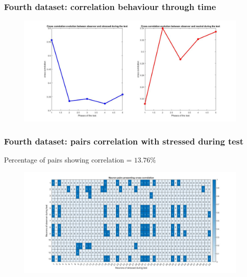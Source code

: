 \documentclass{beamer}
\begin{document}
\begin{frame}
\frametitle{Fourth dataset: correlation behaviour through time}


\begin{figure}[H]
\begin{center}
\hspace*{-1cm}
\includegraphics[scale=.28]{corr_time4.jpg} 
\end{center}  


\end{figure}

\end{frame}

\begin{frame}
\frametitle{Fourth dataset: pairs correlation with stressed during test}

Percentage of pairs showing correlation = $ 13.76\%$

\begin{figure}[H]
	\begin{center}
		\hspace*{-1cm}
		\includegraphics[scale=.28]{neuron_corr_stress_test4.jpg} 
	\end{center}  
	
	
\end{figure}

\end{frame}
\end{document}
